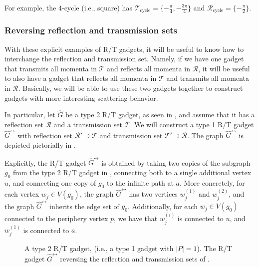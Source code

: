 \documentclass[../thesis-main/thesis-main]{subfiles}
\begin{document}
For example, the $4$-cycle (i.e., square) has $\mathcal{T}_{\mathrm{cycle}} = \{-\frac{\pi}{4},-\frac{3\pi}{4}\}$ and $\mathcal{R}_{\mathrm{cycle}} = \{-\frac{\pi}{2}\}$.  

\subsubsection{Reversing reflection and transmission sets}\label{sec:reversal}

With these explicit examples of R/T gadgets, it will be useful to know how to interchange the reflection and transmission set.  Namely, if we have one gadget that transmits all momenta in $\mathcal{T}$ and reflects all momenta in $\mathcal{R}$, it will be useful to also have a gadget that reflects all momenta in $\mathcal{T}$ and transmits all momenta in $\mathcal{R}$.  Basically, we will be able to use these two gadgets together to construct gadgets with more interesting scattering behavior.

In particular, let $\widehat{G}$ be a type 2 R/T gadget, as seen in , and assume that it has a reflection set $\mathcal{R}$ and a transmission set $\mathcal{T}$.  We will construct a type 1 R/T gadget $\widehat{G}^{\leftrightarrow}$ with reflection set $\mathcal{R'} \supset \mathcal{T}$ and transmission set $\mathcal{T}' \supset \mathcal{R}$.  The graph $\widehat{G}^{\leftrightarrow}$ is depicted pictorially in .

Explicitly, the R/T gadget $\widehat{G}^\leftrightarrow$ is obtained by taking two copies of the subgraph $g_0$ from the type 2 R/T gadget in , connecting both to a single additional vertex $u$, and connecting one copy of $g_0$ to the infinite path at $a$.  More concretely, for each vertex $w_j\in V(g_0)$, the graph $\widehat{G}^{\leftrightarrow}$ has two vertices $w_j^{(1)}$ and $w_j^{(2)}$, and the graph $\widehat{G}^\leftrightarrow$ inherits the edge set of $g_0$.  Additionally, for each $w_j\in V(g_0)$ connected to the periphery vertex $p$, we have that $w_j^{(i)}$ is connected to $u$, and $w_j^{(1)}$ is connected to $a$.

\begin{figure}
  \centering
  \qquad
   \caption[Type 2 R/T Gadget and Reversal R/T gadget]{  A type 2 R/T gadget, (i.e., a type 1 gadget with $|P| = 1$).    The R/T gadget $\widehat{G}^\leftrightarrow$ reversing the reflection and transmission sets of .}
   \label{fig:reversal}
\end{figure}
\end{document}
